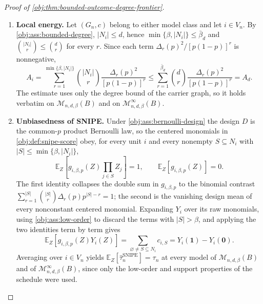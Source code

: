 \begin{proof}[Proof of \cref{obj:thm:bounded-outcome-degree-frontier}]
\begin{enumerate}
Now let \(B>0\) and \(d\ge 1\).  Pick a unit \(i_0\in V_n\) (possible since
\(n\ge1\)), let \(G^{0}\) consist of the single loop \(i_0\to i_0\), and set
\[
c^{0}_{i_0,\varnothing}:=B,
\qquad
c^{0}_{i_0,\{i_0\}}:=-2B,
\]
with all other coefficients zero.  Then \(N_{i_0}=\{i_0\}\) and \(N_i=\varnothing\)
for \(i\ne i_0\), so both degrees in \cref{obj:ass:bounded-degree} are at most
\(1\le d\), and the only nonzero coefficients are indexed by sets of cardinality
at most \(1\le\beta\).  The induced outcomes are
\[
Y_{i_0}(z)=B-2Bz_{i_0}\in\{B,-B\},
\qquad
Y_i(z)=0\quad(i\ne i_0),
\]
so \((G^{0},c^{0})\in\mathcal M_{n,d,\beta}^{\infty}(B)\).  Its coefficient mass
at \(i_0\) is
\[
\sum_{S\subseteq N_{i_0}}|c^{0}_{i_0,S}|=B+2B=3B>B,
\]
so no member of \(\mathcal M_{n,d,\beta}(B)\) has graph \(G^{0}\) and schedule
\(c^{0}\), and the containment is strict.

\item \textbf{Local energy.}
Let \((G_n,c)\) belong to either model class and let \(i\in V_n\).  By
\cref{obj:ass:bounded-degree}, \(|N_i|\le d\), hence
\(\min\{\beta,|N_i|\}\le\bar\beta_d\) and \(\binom{|N_i|}{r}\le\binom dr\) for
every \(r\).  Since each term \(\Delta_r(p)^2/[p(1-p)]^r\) is nonnegative,
\[
A_i
=
\sum_{r=1}^{\min\{\beta,|N_i|\}}\binom{|N_i|}{r}\frac{\Delta_r(p)^2}{[p(1-p)]^r}
\le
\sum_{r=1}^{\bar\beta_d}\binom{d}{r}\frac{\Delta_r(p)^2}{[p(1-p)]^r}
=A_d .
\]
The estimate uses only the degree bound of the carrier graph, so it holds
verbatim on \(\mathcal M_{n,d,\beta}(B)\) and on
\(\mathcal M_{n,d,\beta}^{\infty}(B)\).

\item \textbf{Unbiasedness of SNIPE.}
Under \cref{obj:ass:bernoulli-design} the design \(D\) is the common-\(p\)
product Bernoulli law, so the centered monomials in
\cref{obj:def:snipe-score} obey, for every unit \(i\) and every nonempty
\(S\subseteq N_i\) with \(|S|\le\min\{\beta,|N_i|\}\),
\[
\mathbb E_Z\!\left[g_{i,\beta,p}(Z)\prod_{j\in S}Z_j\right]=1,
\qquad
\mathbb E_Z\!\left[g_{i,\beta,p}(Z)\right]=0 .
\]
The first identity collapses the double sum in \(g_{i,\beta,p}\) to the binomial
contrast \(\sum_{r=1}^{|S|}\binom{|S|}{r}\Delta_r(p)p^{|S|-r}=1\); the second is
the vanishing design mean of every nonconstant centered monomial.  Expanding
\(Y_i\) over its raw monomials, using \cref{obj:ass:low-order} to discard the
terms with \(|S|>\beta\), and applying the two identities term by term gives
\[
\mathbb E_Z\!\left[g_{i,\beta,p}(Z)Y_i(Z)\right]
=
\sum_{\varnothing\ne S\subseteq N_i}c_{i,S}
=
Y_i(\mathbf 1)-Y_i(\mathbf 0).
\]
Averaging over \(i\in V_n\) yields
\(\mathbb E_Z[\widehat\tau_n^{\mathrm{SNIPE}}]=\tau_n\) at every model of
\(\mathcal M_{n,d,\beta}(B)\) and of \(\mathcal M_{n,d,\beta}^{\infty}(B)\), since
only the low-order and support properties of the schedule were used.


\end{enumerate}
\end{proof}
